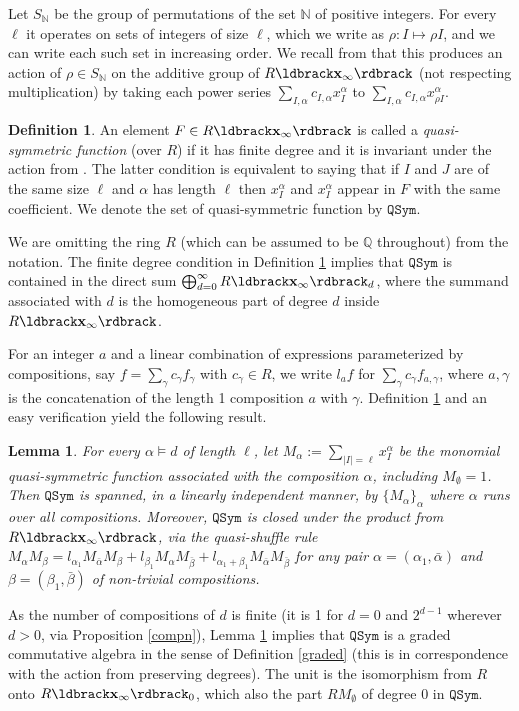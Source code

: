\documentclass{article}
\newtheorem{lem}[thm]{Lemma}
\theoremstyle{definition}
\newtheorem{defn}[thm]{Definition}
\begin{document}
Let $S_{\mathbb{N}}$ be the group of permutations of the set $\mathbb{N}$ of positive integers. For every $\ell$ it operates on sets of integers of size $\ell$, which we write as $\rho:I \mapsto \rho I$, and we can write each such set in increasing order. We recall from \cite{[Hi2]} that this produces an action of $\rho \in S_{\mathbb{N}}$ on the additive group of $R\ldbrack\mathbf{x}_{\infty}\rdbrack$ (not respecting multiplication) by taking each power series $\sum_{I,\alpha}c_{I,\alpha}x_{I}^{\alpha}$ to $\sum_{I,\alpha}c_{I,\alpha}x_{\rho I}^{\alpha}$.
\begin{defn}
An element $F \in R\ldbrack\mathbf{x}_{\infty}\rdbrack$ is called a \emph{quasi-symmetric function} (over $R$) if it has finite degree and it is invariant under the action from \cite{[Hi2]}. The latter condition is equivalent to saying that if $I$ and $J$ are of the same size $\ell$ and $\alpha$ has length $\ell$ then $x_{I}^{\alpha}$ and $x_{I}^{\alpha}$ appear in $F$ with the same coefficient. We denote the set of quasi-symmetric function by $\mathtt{QSym}$. \label{QSymdef}
\end{defn}
We are omitting the ring $R$ (which can be assumed to be $\mathbb{Q}$ throughout) from the notation. The finite degree condition in Definition \ref{QSymdef} implies that $\mathtt{QSym}$ is contained in the direct sum $\bigoplus_{d=0}^{\infty}R\ldbrack\mathbf{x}_{\infty}\rdbrack_{d}$, where the summand associated with $d$ is the homogeneous part of degree $d$ inside $R\ldbrack\mathbf{x}_{\infty}\rdbrack$.

For an integer $a$ and a linear combination of expressions parameterized by compositions, say $f=\sum_{\gamma}c_{\gamma}f_{\gamma}$ with $c_{\gamma} \in R$, we write $l_{a}f$ for $\sum_{\gamma}c_{\gamma}f_{a,\gamma}$, where $a,\gamma$ is the concatenation of the length 1 composition $a$ with $\gamma$. Definition \ref{QSymdef} and an easy verification yield the following result.
\begin{lem}
For every $\alpha \vDash d$ of length $\ell$, let $M_{\alpha}:=\sum_{|I|=\ell}x_{I}^{\alpha}$ be the \emph{monomial quasi-symmetric function} associated with the composition $\alpha$, including $M_{\emptyset}=1$. Then $\mathtt{QSym}$ is spanned, in a linearly independent manner, by $\{M_{\alpha}\}_{\alpha}$ where $\alpha$ runs over all compositions. Moreover, $\mathtt{QSym}$ is closed under the product from $R\ldbrack\mathbf{x}_{\infty}\rdbrack$, via the \emph{quasi-shuffle rule} $M_{\alpha}M_{\beta}=l_{\alpha_{1}}M_{\bar{\alpha}}M_{\beta}+l_{\beta_{1}}M_{\alpha}M_{\bar{\beta}}+l_{\alpha_{1}+\beta_{1}}M_{\bar{\alpha}}M_{\bar{\beta}}$ for any pair $\alpha=(\alpha_{1},\bar{\alpha})$ and $\beta=(\beta_{1},\bar{\beta})$ of non-trivial compositions. \label{monQSym}
\end{lem}
As the number of compositions of $d$ is finite (it is 1 for $d=0$ and $2^{d-1}$ wherever $d>0$, via Proposition \ref{compn}), Lemma \ref{monQSym} implies that $\mathtt{QSym}$ is a graded commutative algebra in the sense of Definition \ref{graded} (this is in correspondence with the action from \cite{[Hi2]} preserving degrees). The unit is the isomorphism from $R$ onto $R\ldbrack\mathbf{x}_{\infty}\rdbrack_{0}$, which also the part $RM_{\emptyset}$ of degree 0 in $\mathtt{QSym}$.
\end{document}

